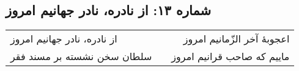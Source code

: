 \begin{center}
\section*{شماره ۱۳: از نادره، نادر جهانیم امروز}
\label{sec:013}
\begin{longtable}{l p{0.5cm} r}
از نادره، نادر جهانیم امروز
&&
اعجوبهٔ آخر الزّمانیم امروز
\\
سلطان سخن نشسته بر مسند فقر
&&
ماییم که صاحب قرانیم امروز
\\
\end{longtable}
\end{center}
